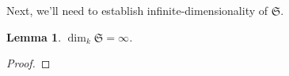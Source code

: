 \documentclass{article}
\def\fsl{\mathfrak{sl}}
\def\fS{\mathfrak{S}}
\newtheorem{lem}{Lemma}
\theoremstyle{definition}
\begin{document}
Next, we'll  need to establish infinite-dimensionality of $\fS$.
\begin{lem}\label{lem:inf}
        $\dim_k\fS=\infty$.
\end{lem}
\begin{proof}

%
%

\end{proof}
\end{document}
